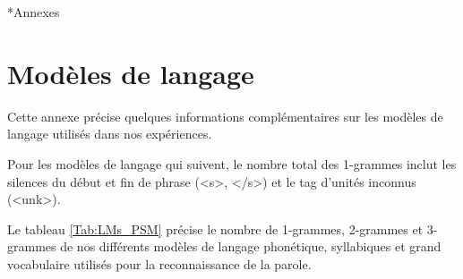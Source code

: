 \documentclass{style/these}
\begin{document}
\begin{part}*{Annexes}


\appendix
\chapter{Modèles de langage}
\renewcommand{\rightmark}{Modèles de langage}
\renewcommand{\leftmark}{Annexe A}


Cette annexe précise quelques informations complémentaires sur les modèles de langage utilisés dans nos expériences. 

Pour les modèles de langage qui suivent, le nombre total des 1-grammes inclut les silences du début et fin de phrase (<s>, </s>) et le tag d'unités inconnus (<unk>).

Le tableau \ref{Tab:LMs_PSM} précise le nombre de 1-grammes, 2-grammes et 3-grammes de nos différents modèles de langage phonétique, syllabiques et grand vocabulaire utilisés pour la reconnaissance de la parole. 


\end{part}
\end{document}
